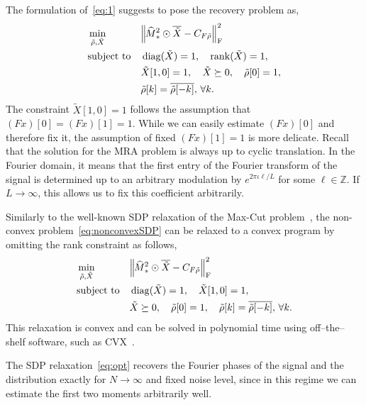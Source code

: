 \documentclass{IEEEtran}
\numberwithin{equation}{section}
\numberwithin{figure}{section}
\theoremstyle{plain}
\theoremstyle{definition}
\theoremstyle{remark}
\theoremstyle{plain}
\theoremstyle{remark}
\theoremstyle{plain}
\theoremstyle{plain}
\theoremstyle{remark}
\newcommand{\F}{F}
\newcommand{\hatM}{\widehat{\hspace{-1pt}M}\phantom{\hspace{-11pt}M}}
\DeclareMathOperator*{\diag}{diag}
\DeclareMathOperator*{\rank}{rank}
\begin{document}
The formulation of~\eqref{eq:1} suggests to pose the recovery problem as,
\begin{equation} \label{eq:nonconvexSDP} 
\begin{aligned}
& \min_{\tilde{\rho},\tilde{X}}
& & \norm{ \hatM^2_\ast \odot\overline{\tilde{X}}   - C_{\F\tilde{\rho}} }_{\textrm{F}}^2 \\
& \text{subject to}
& & \diag(\tilde{X}) = 1, \quad \rank (\tilde{X}) = 1,  \\
&&& \tilde{X}[1,0] = 1 ,\quad  \tilde{X} \succeq 0,  \quad \tilde{\rho}[0] = 1 , \\
&&& \tilde{\rho}[k] = \overline{\tilde{\rho}[-k]}, \, \forall k .
\end{aligned} 
\end{equation}
The constraint $\tilde{X}[1,0] = 1$ follows the assumption that 
$(\F x)[0]=(\F x)[1]=1$. While we can easily estimate $(\F x)[0]$ and therefore fix it, the assumption of fixed $(\F x)[1]=1$ is more delicate. 
Recall that the solution for the MRA problem is always up to cyclic translation. In the Fourier domain, it means that the first entry of the Fourier transform of the signal is determined up to an arbitrary modulation by $e^{2\pi \iota \ell /L}$ for some $\ell\in\mathbb{Z}$. If $L\to\infty$, this allows us to fix this coefficient arbitrarily.

Similarly to the well-known SDP relaxation of the Max-Cut problem~\cite{goemans1995improved}, the non-convex problem~\eqref{eq:nonconvexSDP} can be relaxed to a convex program by omitting the rank constraint as follows,
\begin{equation} \label{eq:opt}
\begin{aligned}
& \min_{\tilde{\rho},\tilde{X}}
& & \norm{ \hatM^2_\ast  \odot\overline{\tilde{X}}   - C_{\F\tilde{\rho}} }_{\textrm{F}}^2 \\
& \text{subject to}
& & \diag(\tilde{X}) = 1, \quad \tilde{X}[1,0] = 1, \\
&&&  \tilde{X} \succeq 0,  \quad \tilde{\rho}[0] = 1 ,\quad   \tilde{\rho}[k] = \overline{\tilde{\rho}[-k]}, \, \forall k .
\end{aligned} 
\end{equation}
This relaxation is convex and can be solved in polynomial time using off--the--shelf software, such as CVX~\cite{grant2008cvx}.


The SDP relaxation~\eqref{eq:opt} recovers the Fourier phases of the signal and the distribution exactly for $N\to\infty $ and fixed noise level, since in this regime we can estimate the first two moments arbitrarily well.
\end{document}
